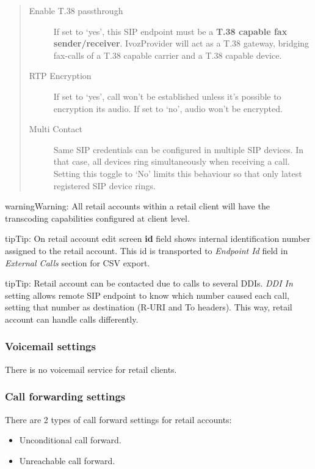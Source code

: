 \documentclass[letterpaper,10pt,english]{sphinxmanual}
\begin{document}
\begin{quote}
\begin{description}
\item[{Enable T.38 passthrough}] \leavevmode
If set to `yes', this SIP endpoint must be a \textbf{T.38 capable fax sender/receiver}. IvozProvider
will act as a T.38 gateway, bridging fax-calls of a T.38 capable carrier and a T.38 capable device.

\item[{RTP Encryption}] \leavevmode
If set to `yes', call won't be established unless it's possible to encryption its audio. If set to `no',
audio won't be encrypted.

\item[{Multi Contact}] \leavevmode
Same SIP credentials can be configured in multiple SIP devices. In that case, all devices ring
simultaneously when receiving a call. Setting this toggle to `No' limits this behaviour so that
only latest registered SIP device rings.

\end{description}
\end{quote}

\begin{notice}{warning}{Warning:}
All retail accounts within a retail client will have the transcoding capabilities configured at client level.
\end{notice}

\begin{notice}{tip}{Tip:}
On retail account edit screen \textbf{id} field shows internal identification number assigned to the retail account.
This id is transported to \emph{Endpoint Id} field in \emph{External Calls} section for CSV export.
\end{notice}

\begin{notice}{tip}{Tip:}
Retail account can be contacted due to calls to several DDIs. \emph{DDI In} setting allows remote SIP endpoint to
know which number caused each call, setting that number as destination (R-URI and To headers). This way, retail
account can handle calls differently.
\end{notice}


\subsubsection{Voicemail settings}
\label{administration_portal/client/retail/retail_accounts:voicemail-settings}
There is no voicemail service for retail clients.


\subsubsection{Call forwarding settings}
\label{administration_portal/client/retail/retail_accounts:call-forwarding-settings}
There are 2 types of call forward settings for retail accounts:
\begin{itemize}
\item {} 
Unconditional call forward.

\item {} 
Unreachable call forward.

\end{itemize}
\end{document}
